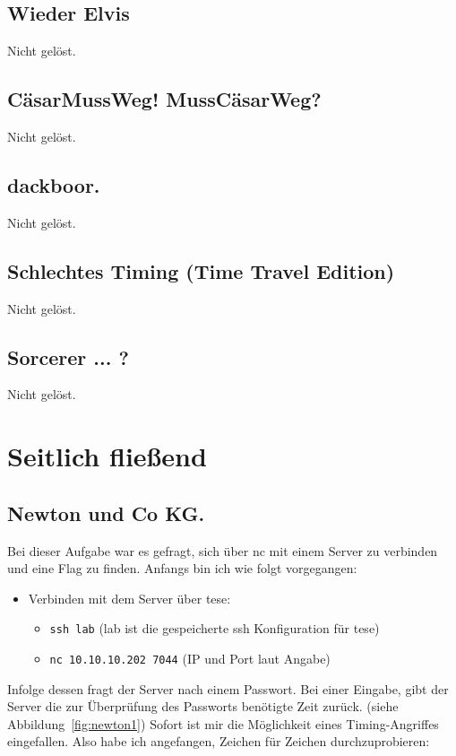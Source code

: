 \documentclass[12pt, a4paper, titlepage, oneside]{scrartcl}
\begin{document}
	\subsection{Wieder Elvis}
	Nicht gelöst.

	\subsection{C\"asarMussWeg! MussC\"asarWeg?}
	Nicht gelöst.

	\subsection{dackboor.}
	Nicht gelöst.

	\subsection{Schlechtes Timing (Time Travel Edition)}
	Nicht gelöst.

	\subsection{Sorcerer ... ?}
	Nicht gelöst.

	\newpage

	\section{Seitlich fließend}

	\subsection{Newton und Co KG.}
	Bei dieser Aufgabe war es gefragt, sich über nc mit einem Server zu verbinden
	und eine Flag zu finden. Anfangs bin ich wie folgt vorgegangen:
	\begin{itemize}
		\item Verbinden mit dem Server über tese:
			\begin{itemize}
				\item \lstinline{ssh lab} (lab ist die gespeicherte ssh Konfiguration für
					tese)

				\item \lstinline{nc 10.10.10.202 7044} (IP und Port laut Angabe)
			\end{itemize}
	\end{itemize}
	Infolge dessen fragt der Server nach einem Passwort. Bei einer Eingabe, gibt
	der Server die zur Überprüfung des Passworts benötigte Zeit zurück. (siehe
	Abbildung~\ref*{fig:newton1}) Sofort ist mir die Möglichkeit eines Timing-Angriffes
	eingefallen. Also habe ich angefangen, Zeichen für Zeichen durchzuprobieren:
\end{document}
